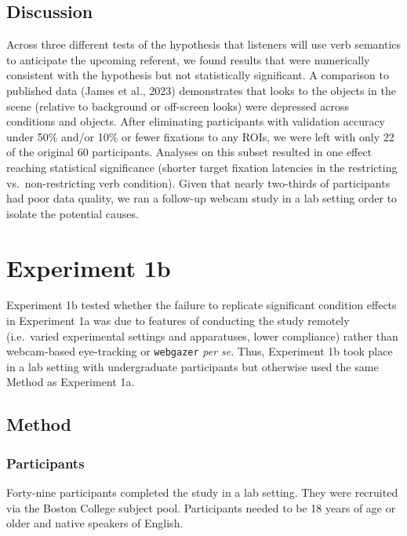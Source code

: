 \documentclass[
  man,floatsintext]{apa6}
\begin{document}
\subsection{Discussion}\label{discussion}

Across three different tests of the hypothesis that listeners will use verb semantics to anticipate the upcoming referent, we found results that were numerically consistent with the hypothesis but not statistically significant. A comparison to published data (James et al., 2023) demonstrates that looks to the objects in the scene (relative to background or off-screen looks) were depressed across conditions and objects. After eliminating participants with validation accuracy under 50\% and/or 10\% or fewer fixations to any ROIs, we were left with only 22 of the original 60 participants. Analyses on this subset resulted in one effect reaching statistical significance (shorter target fixation latencies in the restricting vs.~non-restricting verb condition).
Given that nearly two-thirds of participants had poor data quality, we ran a follow-up webcam study in a lab setting order to isolate the potential causes.

\section{Experiment 1b}\label{experiment-1b}

Experiment 1b tested whether the failure to replicate significant condition effects in Experiment 1a was due to features of conducting the study remotely (i.e.~varied experimental settings and apparatuses, lower compliance) rather than webcam-based eye-tracking or \texttt{webgazer} \emph{per se}. Thus, Experiment 1b took place in a lab setting with undergraduate participants but otherwise used the same Method as Experiment 1a.

\subsection{Method}\label{method-1}

\subsubsection{Participants}\label{participants-2}

Forty-nine participants completed the study in a lab setting. They were recruited via the Boston College subject pool. Participants needed to be 18 years of age or older and native speakers of English.
\end{document}
